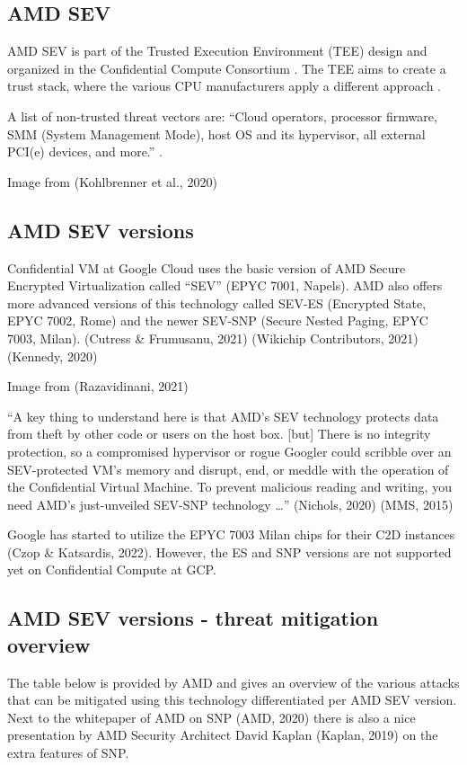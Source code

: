 \subsection*{AMD SEV}
AMD SEV is part of the Trusted Execution Environment (TEE) design 
and organized in the Confidential Compute Consortium 
\citep{foundation_members_2020}. 
The TEE aims to create a trust stack, 
where the various CPU manufacturers apply a different approach 
\citep{eckert_kick-off_2020,kohlbrenner_building_2020}. 

A list of non-trusted threat vectors are: 
“Cloud operators, processor firmware, SMM (System Management Mode), 
host OS and its hypervisor, all external PCI(e) devices, and more.” 
\citep{chamarthy_challenges_2020}.


Image from (Kohlbrenner et al., 2020) 


\subsection*{AMD SEV versions}
Confidential VM at Google Cloud uses the basic version of AMD Secure Encrypted Virtualization called “SEV” (EPYC 7001, Napels). AMD also offers more advanced versions of this technology called 
SEV-ES (Encrypted State, EPYC 7002, Rome) and the newer 
SEV-SNP (Secure Nested Paging, EPYC 7003, Milan). 
(Cutress & Frumusanu, 2021) (Wikichip Contributors, 2021) (Kennedy, 2020)


Image from (Razavidinani, 2021)

“A key thing to understand here is that AMD's SEV technology 
protects data from theft by other code or users on the host box. [but]
There is no integrity protection, so a compromised hypervisor or rogue Googler could scribble over an SEV-protected VM's memory and disrupt, end, or meddle with the operation of the Confidential Virtual Machine. To prevent malicious reading and writing, you need AMD's just-unveiled SEV-SNP technology …” (Nichols, 2020) (MMS, 2015)

Google has started to utilize the EPYC 7003 Milan chips for their C2D instances (Czop & Katsardis, 2022). However, the ES and SNP versions are not supported yet on Confidential Compute at GCP. 


\subsection*{AMD SEV versions - threat mitigation overview}
The table below is provided by AMD and gives an overview of the various attacks that can be mitigated using this technology differentiated per AMD SEV version. Next to the whitepaper of AMD on SNP (AMD, 2020) there is also a nice presentation by AMD Security Architect David Kaplan (Kaplan, 2019) on the extra features of SNP. 

